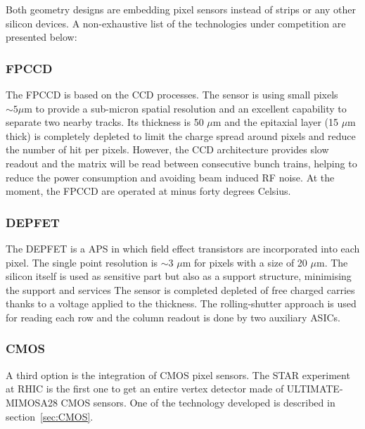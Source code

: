    Both geometry designs are embedding pixel sensors instead of strips or any other silicon devices.
   A non-exhaustive list of the technologies under competition are presented below:
    
   \subsubsection{FPCCD}
   
     The \gls{FPCCD} \cite{CalanchaParedes} is based on the \gls{CCD} processes.
     The sensor is using small pixels $\sim 5 \mu\text{m}$ to provide a sub-micron spatial resolution and an excellent capability to separate two nearby tracks.
     Its thickness is 50 $\mu\text{m}$ and the epitaxial layer (15 $\mu\text{m}$ thick) is completely depleted to limit the charge spread around pixels and reduce the number of hit per pixels.
     However, the \gls{CCD} architecture provides slow readout and the matrix will be read between consecutive bunch trains, helping to reduce the power consumption and avoiding beam induced RF noise.
     At the moment, the \gls{FPCCD} are operated at minus forty degrees Celsius.

   \subsubsection{DEPFET}
    
    The \gls{DEPFET}  is a \gls{APS} in which field effect transistors are incorporated into each pixel.
    The single point resolution is $\sim 3$ $\mu\text{m}$ for pixels with a size of 20 $\mu\text{m}$.
    The silicon itself is used as sensitive part but also as a support structure, minimising the support and services
    The sensor is completed depleted of free charged carries thanks to a voltage applied to the thickness.
    The rolling-shutter approach is used for reading each row and the column readout is done by two auxiliary \glspl{ASIC}.


   \subsubsection{CMOS}

   A third option is the integration of \gls{CMOS} pixel sensors. 
   The STAR experiment at RHIC is the first one to get an entire vertex detector made of ULTIMATE-MIMOSA28 CMOS sensors.
   One of the technology developed is described in section~\ref{sec:CMOS}.

